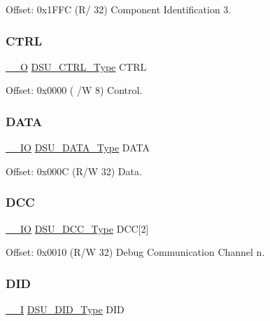 Offset\+: 0x1\+F\+FC (R/ 32) Component Identification 3. 

\mbox{\label{struct_dsu_a24e11e45738520b3929f2a2e0a1baf28}} 
\subsubsection{\texorpdfstring{CTRL}{CTRL}}
{\footnotesize\ttfamily \mbox{\hyperlink{core__cm0plus_8h_a7e25d9380f9ef903923964322e71f2f6}{\+\_\+\+\_\+O}} \mbox{\hyperlink{union_d_s_u___c_t_r_l___type}{D\+S\+U\+\_\+\+C\+T\+R\+L\+\_\+\+Type}} C\+T\+RL}



Offset\+: 0x0000 ( /W 8) Control. 

\mbox{\label{struct_dsu_a5115b1876ae515f5d88ce5f9f871b66f}} 
\subsubsection{\texorpdfstring{DATA}{DATA}}
{\footnotesize\ttfamily \mbox{\hyperlink{core__cm0plus_8h_aec43007d9998a0a0e01faede4133d6be}{\+\_\+\+\_\+\+IO}} \mbox{\hyperlink{union_d_s_u___d_a_t_a___type}{D\+S\+U\+\_\+\+D\+A\+T\+A\+\_\+\+Type}} D\+A\+TA}



Offset\+: 0x000C (R/W 32) Data. 

\mbox{\label{struct_dsu_a787f4c37b8d5b7a47e6603f6b30835d7}} 
\subsubsection{\texorpdfstring{DCC}{DCC}}
{\footnotesize\ttfamily \mbox{\hyperlink{core__cm0plus_8h_aec43007d9998a0a0e01faede4133d6be}{\+\_\+\+\_\+\+IO}} \mbox{\hyperlink{union_d_s_u___d_c_c___type}{D\+S\+U\+\_\+\+D\+C\+C\+\_\+\+Type}} D\+CC\mbox{[}2\mbox{]}}



Offset\+: 0x0010 (R/W 32) Debug Communication Channel n. 

\mbox{\label{struct_dsu_ad7c28a7eefa6630982dd18f09c7bbd32}} 
\subsubsection{\texorpdfstring{DID}{DID}}
{\footnotesize\ttfamily \mbox{\hyperlink{core__cm0plus_8h_af63697ed9952cc71e1225efe205f6cd3}{\+\_\+\+\_\+I}} \mbox{\hyperlink{union_d_s_u___d_i_d___type}{D\+S\+U\+\_\+\+D\+I\+D\+\_\+\+Type}} D\+ID}



